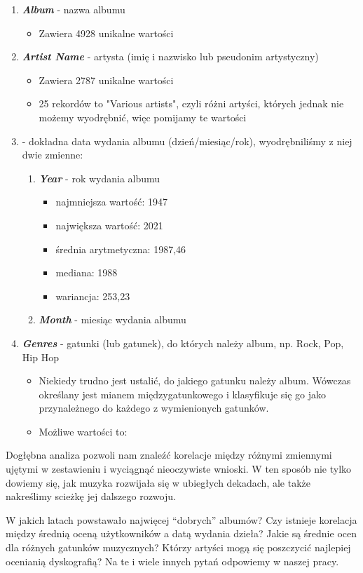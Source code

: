 \documentclass[
  letterpaper,
  DIV=11,
  numbers=noendperiod]{scrartcl}
\begin{document}
\begin{enumerate}
\item \textbf{\textit{Album}} - nazwa albumu
\begin{itemize}
\item Zawiera 4928 unikalne wartości
\end{itemize}
\item \textbf{\textit{Artist Name}} - artysta (imię i nazwisko lub pseudonim artystyczny)
\begin{itemize}
\item Zawiera 2787 unikalne wartości
\item 25 rekordów to "Various artists", czyli różni artyści, których jednak nie możemy wyodrębnić, więc pomijamy te wartości
\end{itemize}
\item \textbf{} - dokładna data wydania albumu (dzień/miesiąc/rok), wyodrębniliśmy z niej dwie zmienne:
\begin{enumerate}
\item \textbf{\textit{Year}} - rok wydania albumu
\begin{itemize}
\item najmniejsza wartość: 1947
\item największa wartość: 2021
\item średnia arytmetyczna: 1987,46
\item mediana: 1988
\item wariancja: 253,23
\end{itemize}
\item \textbf{\textit{Month}} - miesiąc wydania albumu
\end{enumerate}
\item \textbf{\textit{Genres}} - gatunki (lub gatunek), do których należy album, np. Rock, Pop, Hip Hop
\begin{itemize}
\item Niekiedy trudno jest ustalić, do jakiego gatunku należy album. Wówczas określany jest mianem międzygatunkowego i klasyfikuje się go jako przynależnego do każdego z wymienionych gatunków.
\item Możliwe wartości to:
\end{itemize}
\end{enumerate}

Dogłębna analiza pozwoli nam znaleźć korelacje między różnymi zmiennymi
ujętymi w zestawieniu i wyciągnąć nieoczywiste wnioski. W ten sposób nie
tylko dowiemy się, jak muzyka rozwijała się w ubiegłych dekadach, ale
także nakreślimy scieżkę jej dalszego rozwoju.

W jakich latach powstawało najwięcej ``dobrych'' albumów? Czy istnieje
korelacja między średnią oceną użytkowników a datą wydania dzieła? Jakie
są średnie ocen dla różnych gatunków muzycznych? Którzy artyści mogą się
poszczycić najlepiej ocenianią dyskografią? Na te i wiele innych pytań
odpowiemy w naszej pracy.
\end{document}
